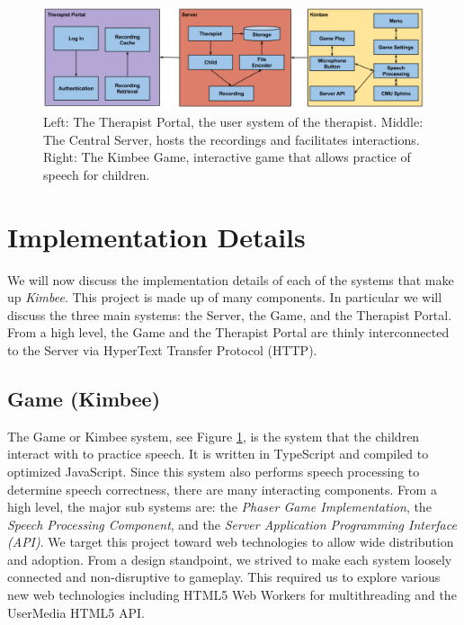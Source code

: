 \documentclass{sig-alternate-2013}
\begin{document}
\begin{figure}[t]
  \centering
  \includegraphics[keepaspectratio, width=\textwidth]{tech_figure.png}
  \vspace{-23 pt}
  \caption{\normalfont Left: The Therapist Portal, the user system of the therapist. Middle: The Central Server, hosts the recordings and facilitates interactions. Right: The Kimbee Game, interactive game that allows practice of speech for children. }
  \label{fig:tech}
\end{figure}

\section{Implementation Details}

We will now discuss the implementation details of each of the systems that make up {\em Kimbee}. This project is made up of many components. In particular we will discuss the three main systems: the Server, the Game, and the Therapist Portal. From a high level, the Game and the Therapist Portal are thinly interconnected to the Server via HyperText Transfer Protocol (HTTP).

\subsection{Game ({\secit Kimbee})}
The Game or Kimbee system, see Figure \ref{fig:tech}, is the system that the children interact with to practice speech. It is written in TypeScript and compiled to optimized JavaScript. Since this system also performs speech processing to determine speech correctness, there are many interacting components. From a high level, the major sub systems are: the {\em Phaser Game Implementation}, the {\em Speech Processing Component}, and the {\em Server Application Programming Interface (API)}. We target this project toward web technologies to allow wide distribution and adoption. From a design standpoint, we strived to make each system loosely connected and non-disruptive to gameplay. This required us to explore various new web technologies including HTML5 Web Workers for multithreading and the UserMedia HTML5 API.
\end{document}

